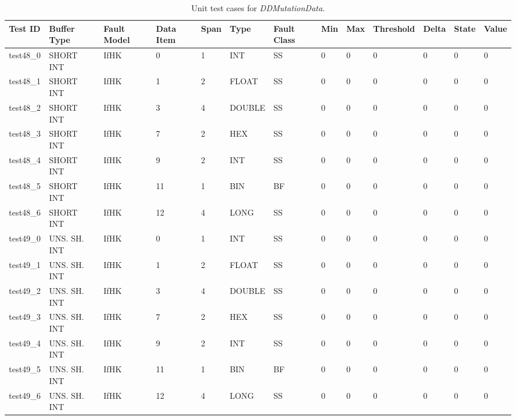 
\setlength\LTleft{0pt}
\setlength\LTright{0pt}
\scriptsize

\begin{longtable}{|l|l|l|p{0.5cm}|p{0.5cm}|l|p{0.5cm}|p{0.5cm}|p{0.5cm}|l|l|p{0.5cm}|l|}

\caption{Unit test cases for \emph{DDMutationData}.}
\label{table:matrix_DATA} \\

\hline
\textbf{Test ID} & \textbf{Buffer Type} & \textbf{Fault Model} & \textbf{Data Item} & \textbf{Span} & \textbf{Type} & \textbf{Fault Class} & \textbf{Min} & \textbf{Max} & \textbf{Threshold} & \textbf{Delta} & \textbf{State} & \textbf{Value}\\
\hline
test48\_0 & SHORT INT & IfHK & 0 & 1 & INT & SS & 0 & 0 & 0 & 0 & 0 & 0 \\
test48\_1 & SHORT INT & IfHK & 1 & 2 & FLOAT & SS & 0 & 0 & 0 & 0 & 0 & 0 \\
test48\_2 & SHORT INT & IfHK & 3 & 4 & DOUBLE & SS & 0 & 0 & 0 & 0 & 0 & 0 \\
test48\_3 & SHORT INT & IfHK & 7 & 2 & HEX & SS & 0 & 0 & 0 & 0 & 0 & 0 \\
test48\_4 & SHORT INT & IfHK & 9 & 2 & INT & SS & 0 & 0 & 0 & 0 & 0 & 0 \\
test48\_5 & SHORT INT & IfHK & 11 & 1 & BIN & BF & 0 & 0 & 0 & 0 & 0 & 0 \\
test48\_6 & SHORT INT & IfHK & 12 & 4 & LONG & SS & 0 & 0 & 0 & 0 & 0 & 0 \\
test49\_0 & UNS. SH. INT & IfHK & 0 & 1 & INT & SS & 0 & 0 & 0 & 0 & 0 & 0 \\
test49\_1 & UNS. SH. INT & IfHK & 1 & 2 & FLOAT & SS & 0 & 0 & 0 & 0 & 0 & 0 \\
test49\_2 & UNS. SH. INT & IfHK & 3 & 4 & DOUBLE & SS & 0 & 0 & 0 & 0 & 0 & 0 \\
test49\_3 & UNS. SH. INT & IfHK & 7 & 2 & HEX & SS & 0 & 0 & 0 & 0 & 0 & 0 \\
test49\_4 & UNS. SH. INT & IfHK & 9 & 2 & INT & SS & 0 & 0 & 0 & 0 & 0 & 0 \\
test49\_5 & UNS. SH. INT & IfHK & 11 & 1 & BIN & BF & 0 & 0 & 0 & 0 & 0 & 0 \\
test49\_6 & UNS. SH. INT & IfHK & 12 & 4 & LONG & SS & 0 & 0 & 0 & 0 & 0 & 0 \\

\end{longtable}
